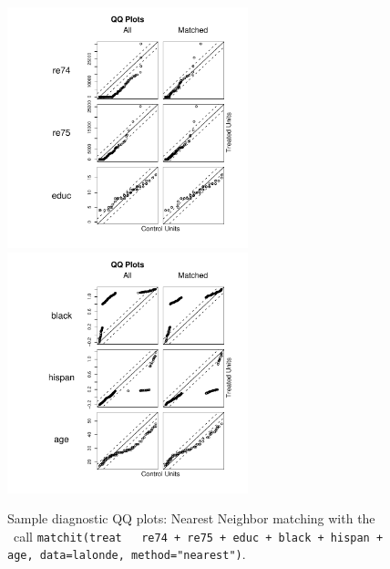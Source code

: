 \begin{figure}[tbp]
  \begin{center}
    \includegraphics[width=2.75in, height=2.75in]{figs/qqplotnn1.pdf}
    \includegraphics[width=2.75in, height=2.75in]{figs/qqplotnn2.pdf}
    \hfill
    \caption{Sample diagnostic QQ plots: Nearest Neighbor matching
      with the \MatchIt\ call \texttt{matchit(treat ~ re74 + re75 + educ
        + black + hispan + age, data=lalonde, method="nearest")}.}
    \label{diagqqnn}
  \end{center}
\end{figure}


